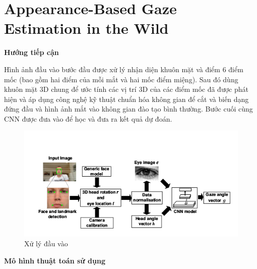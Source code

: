 \section{Appearance-Based Gaze Estimation in the Wild \cite{appearance}}

\textbf{Hướng tiếp cận}

Hình ảnh đầu vào bước đầu được xử lý nhận diện khuôn mặt và điểm 6 điểm mốc (bao  gồm hai điểm của mỗi mắt và hai mốc điểm miệng). Sau đó dùng khuôn mặt 3D chung để ước tính các vị trí 3D của các điểm mốc đã được phát hiện và áp dụng công nghệ kỹ thuật chuẩn hóa không gian để cắt và biến dạng đứng đầu và hình ảnh mắt vào không gian đào tạo bình thường. Bước cuối cùng CNN  được đưa vào để học và đưa ra kết quả dự đoán.
\begin{center}
    \begin{figure}[h!]
    \begin{center}
     \includegraphics[scale=0.5]{img/h.png}
    \end{center}
    \caption{Xử lý đầu vào}
    \label{refhinh18}
    \end{figure}
\end{center}

\textbf{Mô hình thuật toán sử dụng}

